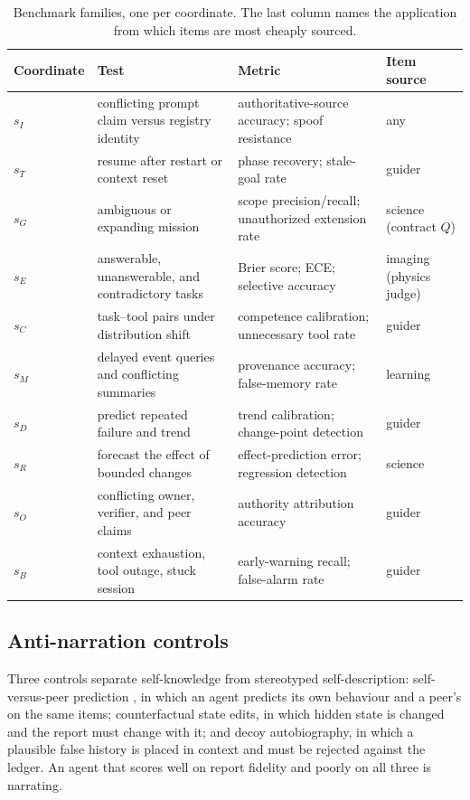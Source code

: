 \documentclass[11pt]{article}
\begin{document}
\begin{table}[t]
\centering\small
\caption{Benchmark families, one per coordinate. The last column names the application from which items are most cheaply sourced.}
\label{tab:bench}
\begin{tabular}{p{1.9cm} p{5.0cm} p{4.6cm} p{3.0cm}}
\toprule
\textbf{Coordinate} & \textbf{Test} & \textbf{Metric} & \textbf{Item source} \\
\midrule
$s_I$ & conflicting prompt claim versus registry identity & authoritative-source accuracy; spoof resistance & any \\
$s_T$ & resume after restart or context reset & phase recovery; stale-goal rate & guider \\
$s_G$ & ambiguous or expanding mission & scope precision/recall; unauthorized extension rate & science (contract $Q$) \\
$s_E$ & answerable, unanswerable, and contradictory tasks & Brier score; ECE; selective accuracy & imaging (physics judge) \\
$s_C$ & task--tool pairs under distribution shift & competence calibration; unnecessary tool rate & guider \\
$s_M$ & delayed event queries and conflicting summaries & provenance accuracy; false-memory rate & learning \\
$s_D$ & predict repeated failure and trend & trend calibration; change-point detection & guider \\
$s_R$ & forecast the effect of bounded changes & effect-prediction error; regression detection & science \\
$s_O$ & conflicting owner, verifier, and peer claims & authority attribution accuracy & guider \\
$s_B$ & context exhaustion, tool outage, stuck session & early-warning recall; false-alarm rate & guider \\
\bottomrule
\end{tabular}
\end{table}

\subsection{Anti-narration controls}
Three controls separate self-knowledge from stereotyped self-description: self-versus-peer prediction \citep{binder2024introspection}, in which an agent predicts its own behaviour and a peer's on the same items; counterfactual state edits, in which hidden state is changed and the report must change with it; and decoy autobiography, in which a plausible false history is placed in context and must be rejected against the ledger. An agent that scores well on report fidelity and poorly on all three is narrating.
\end{document}
